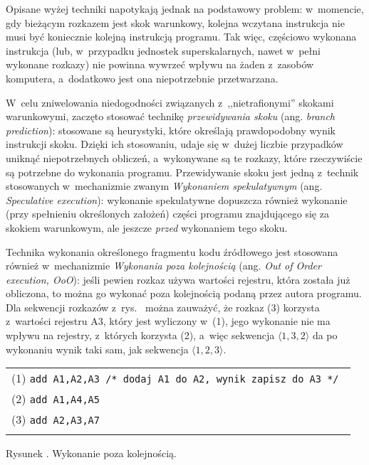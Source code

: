 \documentclass[12pt]{mwart}
\newcounter{figmain}
\newcommand{\myfigcounter}[1]{ \begin{center}\parbox[t]{11.5cm}{Rysunek \arabic{figmain}. #1.}\end{center} \addtocounter{figmain}{1} }
\begin{document}
%
\indent
	Opisane wyżej techniki napotykają jednak na podstawowy problem: w~momencie, gdy bieżącym rozkazem jest skok warunkowy, kolejna wczytana 
	instrukcja nie musi być koniecznie kolejną instrukcją programu. Tak więc, częściowo wykonana instrukcja (lub, w~przypadku jednostek
	superskalarnych, nawet w~pełni wykonane rozkazy) nie powinna wywrzeć wpływu na żaden z~zasobów komputera, 
	a~dodatkowo jest ona niepotrzebnie przetwarzana.
\par
%
\indent
	W~celu zniwelowania niedogodności związanych z~,,nietrafionymi'' skokami warunkowymi, zaczęto stosować technikę 
	\emph{przewidywania skoku} (ang. \emph{branch prediction}): stosowane są heurystyki, które określają prawdopodobny
	wynik instrukcji skoku. Dzięki ich stosowaniu, udaje się w~dużej liczbie przypadków uniknąć niepotrzebnych obliczeń,
	a~wykonywane są te rozkazy, które rzeczywiście są potrzebne do wykonania programu.
	Przewidywanie skoku jest jedną z~technik stosowanych w~mechanizmie zwanym \emph{Wykonaniem spekulatywnym} (ang. \emph{Speculative execution}):
	wykonanie spekulatywne dopuszcza również wykonanie (przy spełnieniu określonych założeń) części programu znajdującego się za skokiem warunkowym,
	ale jeszcze \emph{przed} wykonaniem tego skoku.
\par
%
 \setcounter{oooex}{\value{figmain}}
\indent
	Technika wykonania określonego fragmentu kodu źródłowego jest stosowana również w~mechanizmie \emph{Wykonania poza kolejnością}
	(ang. \emph{Out of Order execution, OoO}): jeśli pewien rozkaz używa wartości rejestru, która została już obliczona, to można go wykonać
	poza kolejnością podaną przez autora programu. Dla sekwencji rozkazów z~rys.~
	można zauważyć, że rozkaz (3) korzysta z~wartości rejestru A3, który jest wyliczony w~(1), jego wykonanie nie ma wpływu na rejestry, z~których 
	korzysta (2), a~więc sekwencja $\langle 1, 3, 2 \rangle $ da po wykonaniu wynik taki sam, jak sekwencja $\langle 1, 2, 3 \rangle $.
	\begin{center}
	\begin{tabular}{l}\\
		(1) {\tt add A1,A2,A3 /* dodaj A1 do A2, wynik zapisz do A3 */ } \\
		(2) {\tt add A1,A4,A5 } \\
		(3) {\tt add A2,A3,A7 } \\
		\\
	\end{tabular}
  \myfigcounter{Wykonanie poza kolejnością}
	\end{center}
\end{document}

